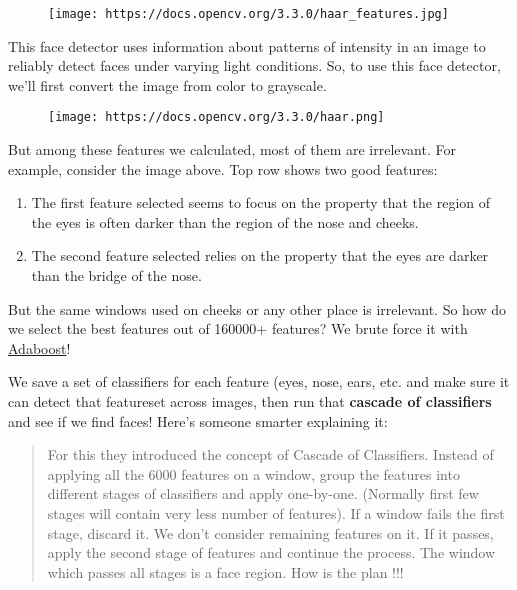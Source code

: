 \documentclass[11pt]{article}
\makeatletter
\def\maxwidth{\ifdim\Gin@nat@width>\linewidth\linewidth
    \else\Gin@nat@width\fi}
\let\Oldincludegraphics\includegraphics
\renewcommand{\includegraphics}[1]{\Oldincludegraphics[width=.8\maxwidth]{#1}}
\makeatother
\begin{document}
\begin{figure}
\centering
\texttt{[image: https://docs.opencv.org/3.3.0/haar\_features.jpg]}
\caption{}
\end{figure}

This face detector uses information about patterns of intensity in an
image to reliably detect faces under varying light conditions. So, to
use this face detector, we'll first convert the image from color to
grayscale.

\begin{figure}
\centering
\texttt{[image: https://docs.opencv.org/3.3.0/haar.png]}
\caption{}
\end{figure}

But among these features we calculated, most of them are irrelevant. For
example, consider the image above. Top row shows two good features:

\begin{enumerate}
\def\labelenumi{\arabic{enumi})}
\item
  The first feature selected seems to focus on the property that the
  region of the eyes is often darker than the region of the nose and
  cheeks.
\item
  The second feature selected relies on the property that the eyes are
  darker than the bridge of the nose.
\end{enumerate}

But the same windows used on cheeks or any other place is irrelevant. So
how do we select the best features out of 160000+ features? We brute
force it with \href{https://en.wikipedia.org/wiki/AdaBoost}{Adaboost}!

We save a set of classifiers for each feature (eyes, nose, ears, etc.
and make sure it can detect that featureset across images, then run that
\textbf{cascade of classifiers} and see if we find faces! Here's someone
smarter explaining it:

\begin{quote}
For this they introduced the concept of Cascade of Classifiers. Instead
of applying all the 6000 features on a window, group the features into
different stages of classifiers and apply one-by-one. (Normally first
few stages will contain very less number of features). If a window fails
the first stage, discard it. We don't consider remaining features on it.
If it passes, apply the second stage of features and continue the
process. The window which passes all stages is a face region. How is the
plan !!!
\end{quote}
\end{document}
